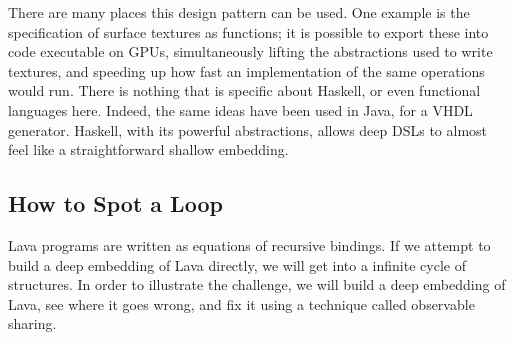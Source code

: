 \documentclass[11pt]{article}
\begin{document}
There are many places this design pattern can be used. One example is the specification
of surface textures as functions; it is possible to export these into code executable
on GPUs, simultaneously lifting the abstractions used to write textures, and speeding
up how fast an implementation of the same operations would run.  There is nothing
that is specific about Haskell, or even functional languages here. Indeed, the same
ideas have been used in Java, for a VHDL generator\cite{Bellows:98:JHDL}. 
Haskell, with its powerful abstractions,
allows deep DSLs to almost feel like a straightforward shallow embedding.



\subsection{How to Spot a Loop}

Lava programs are written as equations of recursive bindings.
If we attempt to build a deep embedding of Lava directly,
we will get into a infinite cycle of structures. In order to illustrate
the challenge, we will build a deep embedding of Lava,
see where it goes wrong, and fix it using a technique called
observable sharing.
\end{document}
